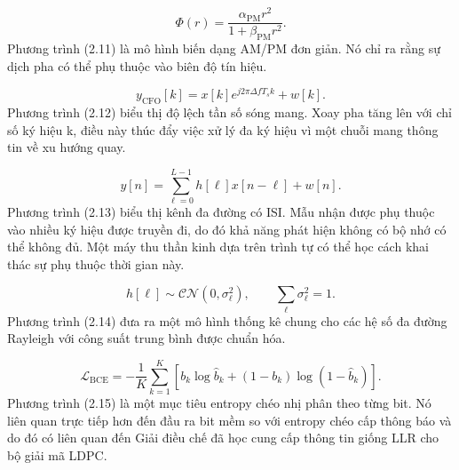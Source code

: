 \begin{equation}
\Phi(r)=\frac{\alpha_{\mathrm{PM}}r^2}{1+\beta_{\mathrm{PM}}r^2}.
\end{equation}
Phương trình (2.11) là mô hình biến dạng AM/PM đơn giản. Nó chỉ ra rằng sự dịch pha có thể phụ thuộc vào biên độ tín hiệu.

\begin{equation}
y_{\mathrm{CFO}}[k]=x[k]e^{j2\pi \Delta f T_s k}+w[k].
\end{equation}
Phương trình (2.12) biểu thị độ lệch tần số sóng mang. Xoay pha tăng lên với chỉ số ký hiệu k, điều này thúc đẩy việc xử lý đa ký hiệu vì một chuỗi mang thông tin về xu hướng quay.

\begin{equation}
y[n]=\sum_{\ell=0}^{L-1}h[\ell]x[n-\ell]+w[n].
\end{equation}
Phương trình (2.13) biểu thị kênh đa đường có ISI. Mẫu nhận được phụ thuộc vào nhiều ký hiệu được truyền đi, do đó khả năng phát hiện không có bộ nhớ có thể không đủ. Một máy thu thần kinh dựa trên trình tự có thể học cách khai thác sự phụ thuộc thời gian này.

\begin{equation}
h[\ell]\sim\mathcal{CN}(0,\sigma_{\ell}^{2}),\qquad \sum_{\ell}\sigma_{\ell}^{2}=1.
\end{equation}
Phương trình (2.14) đưa ra một mô hình thống kê chung cho các hệ số đa đường Rayleigh với công suất trung bình được chuẩn hóa.

\begin{equation}
\mathcal{L}_{\mathrm{BCE}}=-\frac{1}{K}\sum_{k=1}^{K}\left[b_k\log \hat{b}_k+(1-b_k)\log(1-\hat{b}_k)\right].
\end{equation}
Phương trình (2.15) là một mục tiêu entropy chéo nhị phân theo từng bit. Nó liên quan trực tiếp hơn đến đầu ra bit mềm so với entropy chéo cấp thông báo và do đó có liên quan đến Giải điều chế đã học cung cấp thông tin giống LLR cho bộ giải mã LDPC.

